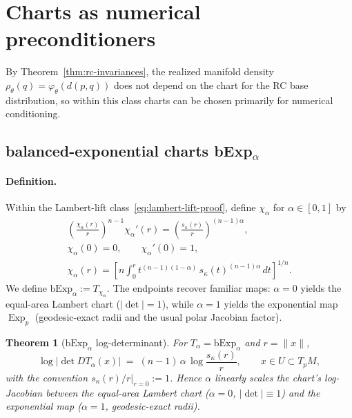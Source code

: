 \documentclass{article}
\newtheorem{theorem}{Theorem}
\theoremstyle{definition}
\theoremstyle{remark}
\newcommand{\bExp}{\mathrm{bExp}}
\newcommand{\Exp}{\operatorname{Exp}}
\begin{document}
\section{Charts as numerical preconditioners}
\label{sec:precond}
\label{sec:main}

By Theorem~\ref{thm:rc-invariances}, the realized manifold density
$\rho_\theta(q)=\varphi_\theta(d(p,q))$ does not depend on the chart for the
RC base distribution, so within this class charts can be chosen primarily for
numerical conditioning.

\subsection{balanced-exponential charts bExp$_\alpha$}

\paragraph{Definition.}
Within the Lambert-lift class~\eqref{eq:lambert-lift-proof}, define $\chi_\alpha$ for $\alpha\in[0,1]$ by
\begin{gather}
\left(\frac{\chi_\alpha(r)}{r}\right)^{n-1}\chi_\alpha'(r)
=
\left(\frac{s_\kappa(r)}{r}\right)^{(n-1)\alpha},
\label{eq:bexp-ode}
\\[-2pt]
\chi_\alpha(0)=0,
\qquad
\chi_\alpha'(0)=1,
\label{eq:bexp-ic}
\\
\chi_\alpha(r)
=
\left[
n\int_0^r
t^{(n-1)(1-\alpha)}\, s_\kappa(t)^{(n-1)\alpha}\,dt
\right]^{1/n}.
\label{eq:bexp-int}
\end{gather}
We define $\mathrm{bExp}_\alpha:=T_{\chi_\alpha}$. The endpoints recover familiar maps: $\alpha=0$ yields the equal-area Lambert chart ($|\det|=1$), while $\alpha=1$ yields the exponential map $\Exp_p$ (geodesic-exact radii and the usual polar Jacobian factor).


\begin{theorem}[$\bExp_\alpha$ log-determinant]
\label{thm:bexp-logdet}
For $T_\alpha=\bExp_\alpha$ and $r=\|x\|$,
\[
  \log\bigl|\det DT_\alpha(x)\bigr|
  \;=\;(n-1)\,\alpha\,\log\frac{s_\kappa(r)}{r},
  \qquad x\in U\subset T_pM,
\]
with the convention $s_\kappa(r)/r\big|_{r=0}:=1$.
Hence $\alpha$ linearly scales the chart's log-Jacobian between the equal-area
Lambert chart ($\alpha{=}0$, $|\!\det\!|\equiv 1$) and the exponential map
($\alpha{=}1$, geodesic-exact radii).
\end{theorem}
\end{document}
